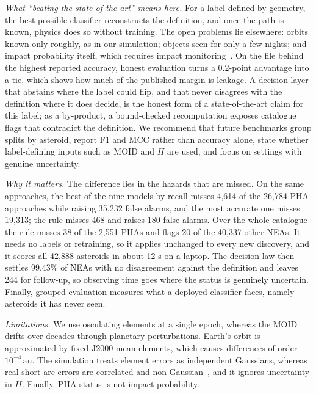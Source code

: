 \documentclass[conference]{IEEEtran}
\newcommand{\au}{\,\mathrm{au}}
\begin{document}
\emph{What ``beating the state of the art'' means here.} For a label defined by geometry, the best possible classifier reconstructs the definition, and once the path is known, physics does so without training. The open problems lie elsewhere: orbits known only roughly, as in our simulation; objects seen for only a few nights; and impact probability itself, which requires impact monitoring~\cite{milani2005,roa2021}. On the file behind the highest reported accuracy, honest evaluation turns a 0.2-point advantage into a tie, which shows how much of the published margin is leakage. A decision layer that abstains where the label could flip, and that never disagrees with the definition where it does decide, is the honest form of a state-of-the-art claim for this label; as a by-product, a bound-checked recomputation exposes catalogue flags that contradict the definition. We recommend that future benchmarks group splits by asteroid, report F1 and MCC rather than accuracy alone, state whether label-defining inputs such as MOID and $H$ are used, and focus on settings with genuine uncertainty.

\emph{Why it matters.} The difference lies in the hazards that are missed. On the same approaches, the best of the nine models by recall misses 4,614 of the 26,784 PHA approaches while raising 35,232 false alarms, and the most accurate one misses 19,313; the rule misses 468 and raises 180 false alarms. Over the whole catalogue the rule misses 38 of the 2,551 PHAs and flags 20 of the 40,337 other NEAs. It needs no labels or retraining, so it applies unchanged to every new discovery, and it scores all 42,888 asteroids in about 12 s on a laptop. The decision law then settles 99.43\% of NEAs with no disagreement against the definition and leaves 244 for follow-up, so observing time goes where the status is genuinely uncertain. Finally, grouped evaluation measures what a deployed classifier faces, namely asteroids it has never seen.

\emph{Limitations.} We use osculating elements at a single epoch, whereas the MOID drifts over decades through planetary perturbations. Earth's orbit is approximated by fixed J2000 mean elements, which causes differences of order $10^{-4}\au$. The simulation treats element errors as independent Gaussians, whereas real short-arc errors are correlated and non-Gaussian~\cite{milani_gronchi2009}, and it ignores uncertainty in $H$. Finally, PHA status is not impact probability.
\end{document}
